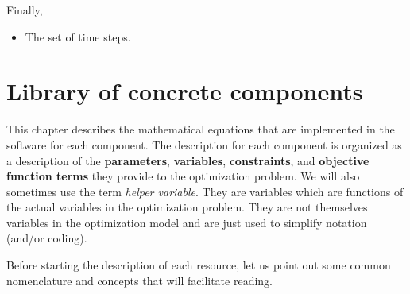\documentclass[]{report}
\renewcommand{\emph}{\textbf}
\newcommand{\resourcesg}{\mathcal{R}_g}
\newcommand{\resourcesr}{\mathcal{R}_r}
\newcommand{\resourcesn}{\mathcal{R}_n}
\newcommand{\componentsr}{\mathcal{C}_r}
\newcommand{\groupsr}{\mathcal{G}_r}
\newcommand{\marketsg}{\mathcal{M}_g}
\newcommand{\marketsr}{\mathcal{M}_r}
\newcommand{\timesteps}{\mathcal{T}}
\newcommand{\outputs}{\mathcal{O}}
\newcommand{\inputs}{\mathcal{I}}
\begin{document}



Finally, 

\begin{itemize}
    \item [$\timesteps$] The set of time steps.
\end{itemize}



\newpage

\chapter{Library of concrete components}

This chapter describes the mathematical equations that are implemented in the software for each component. The description for each component is organized as a description of the \emph{parameters}, \emph{variables}, \emph{constraints}, and \emph{objective function terms} they provide to the optimization problem. We will also sometimes use the term \textit{helper variable}. They are variables which are functions of the actual variables in the optimization problem. They are not themselves variables in the optimization model and are just used to simplify notation (and/or coding).

Before starting the description of each resource, let us point out some common nomenclature and concepts that will facilitate reading.
\end{document}
